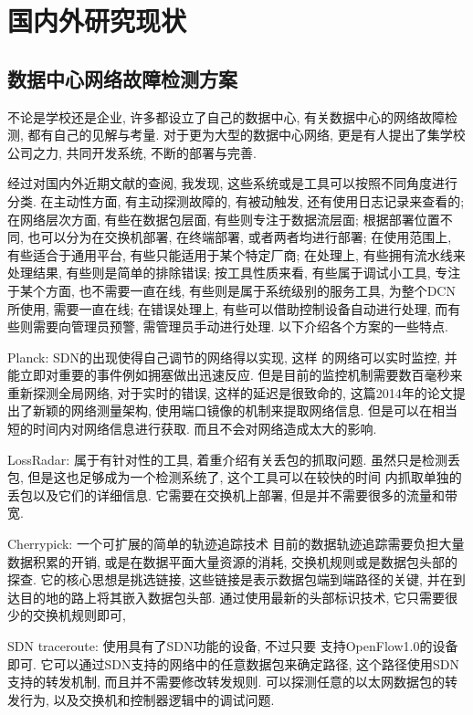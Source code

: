 \chapter{国内外研究现状}
\section{数据中心网络故障检测方案}

不论是学校还是企业, 许多都设立了自己的数据中心,
有关数据中心的网络故障检测, 都有自己的见解与考量. 对于更为大型的数据中心网络,
更是有人提出了集学校公司之力, 共同开发系统, 不断的部署与完善.

经过对国内外近期文献的查阅, 我发现,
这些系统或是工具可以按照不同角度进行分类. 在主动性方面,
有主动探测故障的, 有被动触发, 还有使用日志记录来查看的; 在网络层次方面,
有些在数据包层面, 有些则专注于数据流层面; 根据部署位置不同,
也可以分为在交换机部署, 在终端部署, 或者两者均进行部署; 在使用范围上,
有些适合于通用平台, 有些只能适用于某个特定厂商; 在处理上,
有些拥有流水线来处理结果, 有些则是简单的排除错误; 按工具性质来看,
有些属于调试小工具, 专注于某个方面, 也不需要一直在线,
有些则是属于系统级别的服务工具, 为整个DCN所使用, 需要一直在线;
在错误处理上, 有些可以借助控制设备自动进行处理,
而有些则需要向管理员预警, 需管理员手动进行处理. 以下介绍各个方案的一些特点.

Planck: \cite{rasley2014planck} SDN的出现使得自己调节的网络得以实现, 这样
的网络可以实时监控, 并能立即对重要的事件例如拥塞做出迅速反应.
但是目前的监控机制需要数百毫秒来重新探测全局网络, 对于实时的错误,
这样的延迟是很致命的, 这篇2014年的论文提出了新颖的网络测量架构,
使用端口镜像的机制来提取网络信息. 但是可以在相当
短的时间内对网络信息进行获取. 而且不会对网络造成太大的影响.

LossRadar: \cite{li2016lossradar} 属于有针对性的工具,
着重介绍有关丢包的抓取问题. 虽然只是检测丢包,
但是这也足够成为一个检测系统了, 这个工具可以在较快的时间
内抓取单独的丢包以及它们的详细信息. 它需要在交换机上部署,
但是并不需要很多的流量和带宽.

Cherrypick: \cite{tammana2015cherrypick} 一个可扩展的简单的轨迹追踪技术
目前的数据轨迹追踪需要负担大量数据积累的开销,
或是在数据平面大量资源的消耗, 交换机规则或是数据包头部的探查.
它的核心思想是挑选链接, 这些链接是表示数据包端到端路径的关键,
并在到达目的地的路上将其嵌入数据包头部. 通过使用最新的头部标识技术,
它只需要很少的交换机规则即可,

SDN traceroute: \cite{agarwal2014sdn} 使用具有了SDN功能的设备, 不过只要
支持OpenFlow1.0的设备即可. 它可以通过SDN支持的网络中的任意数据包来确定路径,
这个路径使用SDN支持的转发机制, 而且并不需要修改转发规则.
可以探测任意的以太网数据包的转发行为, 以及交换机和控制器逻辑中的调试问题.

